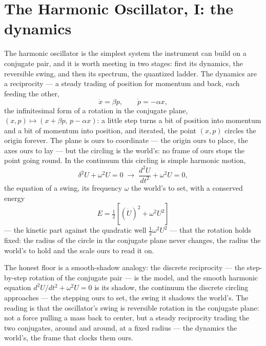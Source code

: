 \section{The Harmonic Oscillator, I: the dynamics}
\label{se:oscillator-dynamics}

The harmonic oscillator is the simplest system the instrument can build on a conjugate pair, and it is worth
meeting in two stages: first its dynamics, the reversible swing, and then its spectrum, the quantized ladder.
The dynamics are a reciprocity --- a steady trading of position for momentum and back, each feeding the
other,
\begin{equation}
  \dot{x} = \beta p, \qquad \dot{p} = -\alpha x,
\end{equation}
the infinitesimal form of a rotation in the conjugate plane, $(x, p) \mapsto (x + \beta p,\, p - \alpha x)$:
a little step turns a bit of position into momentum and a bit of momentum into position, and iterated, the
point $(x, p)$ circles the origin forever. The plane is ours to coordinate --- the origin ours to place, the
axes ours to lay --- but the circling is the world's: no frame of ours stops the point going round. In the
continuum this circling is simple harmonic motion,
\begin{equation}
  \delta^2 U + \omega^2 U = 0 \;\longrightarrow\; \frac{d^2 U}{dt^2} + \omega^2 U = 0,
\end{equation}
the equation of a swing, its frequency $\omega$ the world's to set, with a conserved energy
\begin{equation}
  E = \tfrac12\!\left[ (\dot U)^2 + \omega^2 U^2 \right]
\end{equation}
--- the kinetic part against the quadratic well $\tfrac12\omega^2 U^2$ --- that the rotation holds fixed: the
radius of the circle in the conjugate plane never changes, the radius the world's to hold and the scale ours to
read it on.

The honest floor is a smooth-shadow analogy: the discrete reciprocity --- the step-by-step rotation of the
conjugate pair --- is the model, and the smooth harmonic equation $d^2 U/dt^2 + \omega^2 U = 0$ is its shadow,
the continuum the discrete circling approaches --- the stepping ours to set, the swing it shadows the world's.
The reading is that the oscillator's swing is reversible rotation in the conjugate plane: not a force pulling a
mass back to center, but a steady reciprocity trading the two conjugates, around and around, at a fixed radius
--- the dynamics the world's, the frame that clocks them ours.

